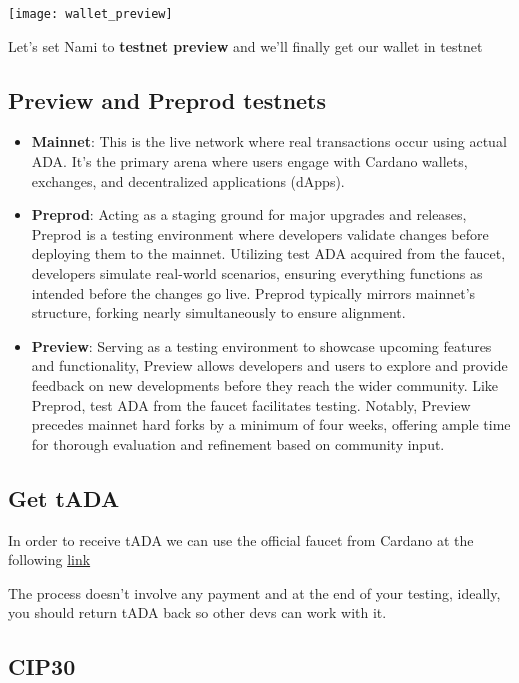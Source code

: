 \texttt{[image: wallet\_preview]}

Let's set Nami to \textbf{testnet preview} and we'll finally get our wallet in testnet

\subsection{Preview and Preprod testnets}

\begin{itemize}
  \item \textbf{Mainnet}: This is the live network where real transactions occur using actual ADA. It's the primary arena where users engage with Cardano wallets, exchanges, and decentralized applications (dApps).
  \item \textbf{Preprod}: Acting as a staging ground for major upgrades and releases, Preprod is a testing environment where developers validate changes before deploying them to the mainnet. Utilizing test ADA acquired from the faucet, developers simulate real-world scenarios, ensuring everything functions as intended before the changes go live. Preprod typically mirrors mainnet's structure, forking nearly simultaneously to ensure alignment.
  \item \textbf{Preview}: Serving as a testing environment to showcase upcoming features and functionality, Preview allows developers and users to explore and provide feedback on new developments before they reach the wider community. Like Preprod, test ADA from the faucet facilitates testing. Notably, Preview precedes mainnet hard forks by a minimum of four weeks, offering ample time for thorough evaluation and refinement based on community input.
\end{itemize}

\subsection{Get tADA}

In order to receive tADA we can use the official faucet from Cardano at the following \href{https://docs.cardano.org/cardano-testnets/tools/faucet/}{link}

The process doesn't involve any payment and at the end of your testing, ideally, you should return tADA back so other devs can work with it.

\subsection{CIP30}

